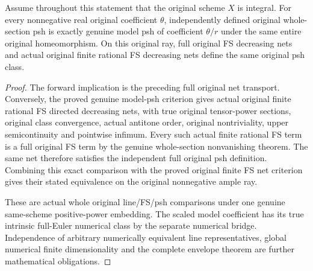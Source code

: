 \begin{theorem}
\label{thm:native-ample-model-full-psh-iff}
\leanok
{}
Assume throughout this statement that the original scheme $X$ is integral.
For every nonnegative real original coefficient $\theta$, independently defined
original whole-section psh is exactly genuine model psh of coefficient
$\theta/r$ under the same entire original homeomorphism. On this original ray,
full original FS decreasing nets and actual original finite rational FS
decreasing nets define the same original psh class.
\end{theorem}
\begin{proof}
The forward implication is the preceding full original net transport.
Conversely, the proved genuine model-psh criterion gives actual original
finite rational FS directed decreasing nets, with true original tensor-power
sections, original class convergence, actual antitone order, original
nontriviality, upper semicontinuity and pointwise infimum. Every such actual
finite rational FS term is a full original FS term by the genuine
whole-section nonvanishing theorem. The same net therefore satisfies the
independent full original psh definition. Combining this exact comparison
with the proved original finite FS net criterion gives their stated
equivalence on the original nonnegative ample ray.

These are actual whole original line/FS/psh comparisons under one genuine
same-scheme positive-power embedding. The scaled model coefficient has its
true intrinsic full-Euler numerical class by the separate numerical bridge.
Independence of arbitrary numerically equivalent line representatives, global
numerical finite dimensionality and the complete envelope theorem are further
mathematical obligations.
\end{proof}
